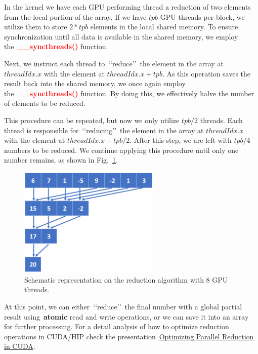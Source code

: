 


\par
In the kernel we have each GPU performing thread a reduction of two elements from the local portion of the array.
If we have $tpb$ GPU threads per block, we utilize them to store $2 * tpb$ elements in the local shared memory.
To ensure synchronization until all data is available in the shared memory, we employ the~\textbf{\textcolor{red}{\_\_syncthreads()}} function.


\par
Next, we instruct each thread to~\lq\lq reduce\rq\rq~the element in the array at $threadIdx.x$ with the element at $threadIdx.x + tpb$.
As this operation saves the result back into the shared memory, we once again employ the~\textbf{\textcolor{red}{\_\_syncthreads()}} function.
By doing this, we effectively halve the number of elements to be reduced.


\par
This procedure can be repeated, but now we only utilize $tpb / 2$ threads.
Each thread is responsible for~\lq\lq reducing\rq\rq~the element in the array at $threadIdx.x$ with the element at $threadIdx.x + tpb / 2$.
After this step, we are left with $tpb / 4$ numbers to be reduced.
We continue applying this procedure until only one number remains, as shown in Fig.~\ref{fig:reduction}.


\begin{figure}[htbp]
\centering\includegraphics[width=0.6\textwidth]{fig_problem/reduction.png}
\caption{Schematic representation on the reduction algorithm with 8 GPU threads.}\label{fig:reduction}
\end{figure}


\par
At this point, we can either~\lq\lq reduce\rq\rq~the final number with a global partial result using~\textbf{atomic} read and write operations, or we can save it into an array for further processing.
For a detail analysis of how to optimize reduction operations in CUDA/HIP check the presentation~\href{https://developer.download.nvidia.com/assets/cuda/files/reduction.pdf}{Optimizing Parallel Reduction in CUDA}.


